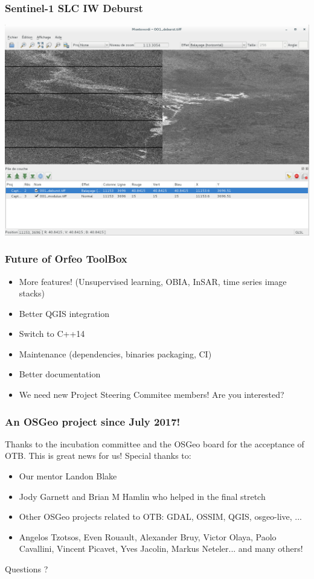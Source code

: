 \documentclass[smaller]{beamer}
\begin{document}
\begin{frame}
\frametitle{Sentinel-1 SLC IW Deburst}
\includegraphics[width=1\textwidth]{images/monteverdi_S1_deburst.png}
\end{frame}

\begin{frame}
\frametitle{Future of Orfeo ToolBox}
\begin{itemize}
\item More features! (Unsupervised learning, OBIA, InSAR, time series image
    stacks)
\item Better QGIS integration
\item Switch to C++14
\item Maintenance (dependencies, binaries packaging, CI)
\item Better documentation
\item We need new Project Steering Commitee members! Are you interested?
\end{itemize}
\end{frame}

\begin{frame}
\frametitle{An OSGeo project since July 2017!}
Thanks to the incubation committee and the OSGeo board for the
acceptance of OTB. This is great news for us! Special thanks to:
\begin{itemize}
\item Our mentor Landon Blake
\item Jody Garnett and Brian M Hamlin who helped in the final stretch
\item Other OSGeo projects related to OTB: GDAL, OSSIM, QGIS, osgeo-live, ...
\item Angelos Tzotsos, Even Rouault, Alexander Bruy, Victor Olaya, Paolo
    Cavallini, Vincent Picavet, Yves Jacolin, Markus Neteler... and many others!
\end{itemize}
\end{frame}

\begin{frame}{Questions ?}
\end{frame}
\end{document}
